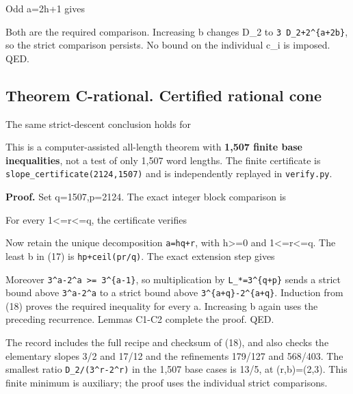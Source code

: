 
Odd a=2h+1 gives


Both are the required comparison. Increasing b changes D\_2 to
\texttt{3\ D\_2+2\^{}\{a+2b\}}, so the strict comparison persists. No
bound on the individual c\_i is imposed. QED.

\subsection{Theorem C-rational. Certified rational cone}

The same strict-descent conclusion holds for


This is a computer-assisted all-length theorem with \textbf{1,507 finite
base inequalities}, not a test of only 1,507 word lengths. The finite
certificate is \nolinkurl{slope_certificate(2124,1507)} and is
independently replayed in \nolinkurl{verify.py}.

\textbf{Proof.} Set q=1507,p=2124. The exact integer block comparison is


For every 1\textless=r\textless=q, the certificate verifies


Now retain the unique decomposition \nolinkurl{a=hq+r}, with
h\textgreater=0 and 1\textless=r\textless=q. The least b in (17) is
\nolinkurl{hp+ceil(pr/q)}. The exact extension step gives


Moreover \texttt{3\^{}a-2\^{}a\ \textgreater{}=\ 3\^{}\{a-1\}}, so
multiplication by \texttt{L\_*=3\^{}\{q+p\}} sends a strict bound above
\nolinkurl{3^a-2^a} to a strict bound above
\texttt{3\^{}\{a+q\}-2\^{}\{a+q\}}. Induction from (18) proves the
required inequality for every a. Increasing b again uses the preceding
recurrence. Lemmas C1-C2 complete the proof. QED.

The record includes the full recipe and checksum of (18), and also
checks the elementary slopes 3/2 and 17/12 and the refinements 179/127
and 568/403. The smallest ratio \nolinkurl{D_2/(3^r-2^r)} in the 1,507
base cases is 13/5, at (r,b)=(2,3). This finite minimum is auxiliary;
the proof uses the individual strict comparisons.

